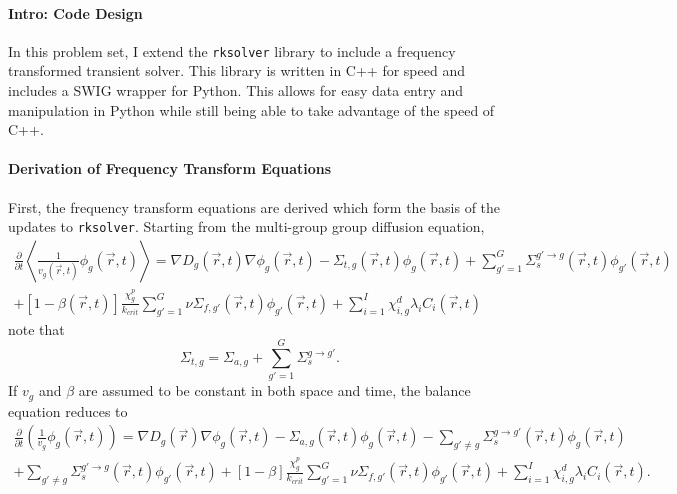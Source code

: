 \documentclass[12pt]{report}
\begin{document}
	
	
	\maketitle
	
	\paragraph{Intro: Code Design}
	In this problem set, I extend the \texttt{rksolver} library to include a frequency transformed transient solver. This library is written in C++ for speed and includes a SWIG wrapper for Python. This allows for easy data entry and manipulation in Python while still being able to take advantage of the speed of C++.
	
	\paragraph{Derivation of Frequency Transform Equations}
	First, the frequency transform equations are derived which form the basis of the updates to \texttt{rksolver}. Starting from the multi-group group diffusion equation,
	\begin{eqnarray}
	\frac{\partial}{\partial t} \left\langle \frac{1}{v_g(\vec{r},t)} \phi_g(\vec{r},t) \right\rangle = \nabla D_g(\vec{r},t) \nabla \phi_g(\vec{r},t) - \Sigma_{t,g}(\vec{r},t) \phi_g(\vec{r},t) + \sum_{g'=1}^{G} \Sigma_{s}^{g'\rightarrow g} (\vec{r},t) \phi_{g'}(\vec{r},t) \nonumber \\ 
	+ \left[ 1- \beta(\vec{r},t) \right] \frac{\chi_g^p}{k_{crit}} \sum_{g'=1}^{G} \nu \Sigma_{f,g'}(\vec{r},t) \phi_{g'}(\vec{r},t) + \sum_{i=1}^{I} \chi_{i,g}^d \lambda_i C_i(\vec{r},t) \nonumber
	\end{eqnarray}
	note that
	\begin{equation}
	\Sigma_{t,g} = \Sigma_{a,g} + \sum_{g'= 1}^G \Sigma_{s}^{g\rightarrow g'} \nonumber.
	\end{equation}
	If $v_g$ and $\beta$ are assumed to be constant in both space and time, the balance equation reduces to
	\begin{eqnarray}
	\frac{\partial}{\partial t} \left( \frac{1}{v_g} \phi_g(\vec{r},t) \right) = \nabla D_g(\vec{r}) \nabla \phi_g(\vec{r},t)  - \Sigma_{a,g}(\vec{r},t) \phi_g(\vec{r},t) - \sum_{g'\neq g} \Sigma_{s}^{g\rightarrow g'} (\vec{r},t) \phi_{g}(\vec{r},t)  \nonumber \\  + \sum_{g' \neq g} \Sigma_{s}^{g'\rightarrow g} (\vec{r},t) \phi_{g'}(\vec{r},t)
	+ \left[ 1- \beta \right] \frac{\chi_g^p}{k_{crit}} \sum_{g'=1}^{G} \nu \Sigma_{f,g'}(\vec{r},t) \phi_{g'}(\vec{r},t) + \sum_{i=1}^{I} \chi_{i,g}^d \lambda_i C_i(\vec{r},t) \nonumber.
	\end{eqnarray}
\end{document}
